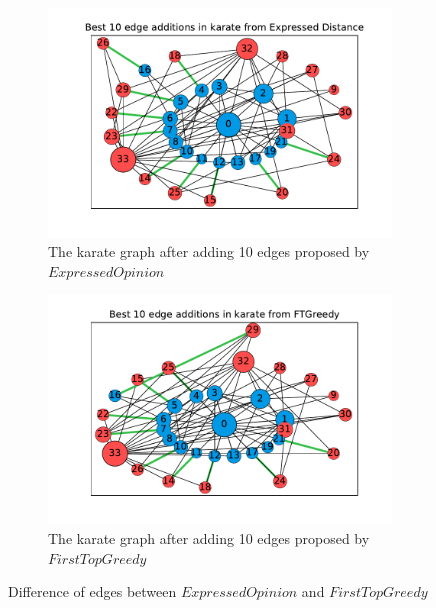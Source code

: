 \clearpage

\begin{figure}[!htbp]
	\centering
	\begin{subfigure}[t]{0.49\textwidth}
		\centering
		 \advance\leftskip-0.9cm
		 \captionsetup{justification=centering}
		\includegraphics[height=0.25\textheight]{Figures/karate_Expressed Distance_edge_vis}
		\caption{The karate graph after adding 10 edges proposed by $ExpressedOpinion$}
		\label{subfig:g2}
	\end{subfigure}
	\hfill
	\begin{subfigure}[t]{0.49\textwidth}
		\centering
		\captionsetup{justification=centering}
		\includegraphics[height=0.25\textheight]{Figures/karate_FTGreedy_edge_vis}
		\caption{The karate graph after adding 10 edges proposed by $FirstTopGreedy$}
		\label{subfig:ftg}
	\end{subfigure}
	\vspace{20pt}
	\hfill
	\caption{Difference of edges between $ExpressedOpinion$ and $FirstTopGreedy$}
	\label{fig:top-10-karate3}
\end{figure}

